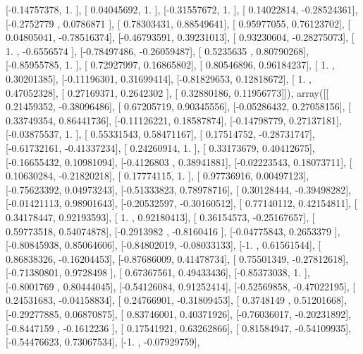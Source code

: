 \documentclass{article}
\begin{document}
       [-0.14757378,  1.        ],
       [ 0.04045692,  1.        ],
       [-0.31557672,  1.        ],
       [ 0.14022814, -0.28524361],
       [-0.2752779 ,  0.0786871 ],
       [ 0.78303431,  0.88549641],
       [ 0.95977055,  0.76123702],
       [ 0.04805041, -0.78516374],
       [-0.46793591,  0.39231013],
       [ 0.93230604, -0.28275073],
       [ 1.        , -0.6556574 ],
       [-0.78497486, -0.26059487],
       [ 0.5235635 ,  0.80790268],
       [-0.85955785,  1.        ],
       [ 0.72927997,  0.16865802],
       [ 0.80546896,  0.96184237],
       [ 1.        ,  0.30201385],
       [-0.11196301,  0.31699414],
       [-0.81829653,  0.12818672],
       [ 1.        ,  0.47052328],
       [ 0.27169371,  0.2642302 ],
       [ 0.32880186,  0.11956773]]), array([[ 0.21459352, -0.38096486],
       [ 0.67205719,  0.90345556],
       [-0.05286432,  0.27058156],
       [ 0.33749354,  0.86441736],
       [-0.11126221,  0.18587874],
       [-0.14798779,  0.27137181],
       [-0.03875537,  1.        ],
       [ 0.55331543,  0.58471167],
       [ 0.17514752, -0.28731747],
       [-0.61732161, -0.41337234],
       [ 0.24260914,  1.        ],
       [ 0.33173679,  0.40412675],
       [-0.16655432,  0.10981094],
       [-0.4126803 ,  0.38941881],
       [-0.02223543,  0.18073711],
       [ 0.10630284, -0.21820218],
       [ 0.17774115,  1.        ],
       [ 0.97736916,  0.00497123],
       [-0.75623392,  0.04973243],
       [-0.51333823,  0.78978716],
       [ 0.30128444, -0.39498282],
       [-0.01421113,  0.98901643],
       [-0.20532597, -0.30160512],
       [ 0.77140112,  0.42154811],
       [ 0.34178447,  0.92193593],
       [ 1.        ,  0.92180413],
       [ 0.36154573, -0.25167657],
       [ 0.59773518,  0.54074878],
       [-0.2913982 , -0.8160416 ],
       [-0.04775843,  0.2653379 ],
       [-0.80845938,  0.85064606],
       [-0.84802019, -0.08033133],
       [-1.        ,  0.61561544],
       [ 0.86838326, -0.16204453],
       [-0.87686009,  0.41478734],
       [ 0.75501349, -0.27812618],
       [-0.71380801,  0.9728498 ],
       [ 0.67367561,  0.49433436],
       [-0.85373038,  1.        ],
       [-0.8001769 ,  0.80444045],
       [-0.54126084,  0.91252414],
       [-0.52569858, -0.47022195],
       [ 0.24531683, -0.04158834],
       [ 0.24766901, -0.31809453],
       [ 0.3748149 ,  0.51201668],
       [-0.29277885,  0.06870875],
       [ 0.83746001,  0.40371926],
       [-0.76036017, -0.20231892],
       [-0.8447159 , -0.1612236 ],
       [ 0.17541921,  0.63262866],
       [ 0.81584947, -0.54109935],
       [-0.54476623,  0.73067534],
       [-1.        , -0.07929759],
\end{document}
